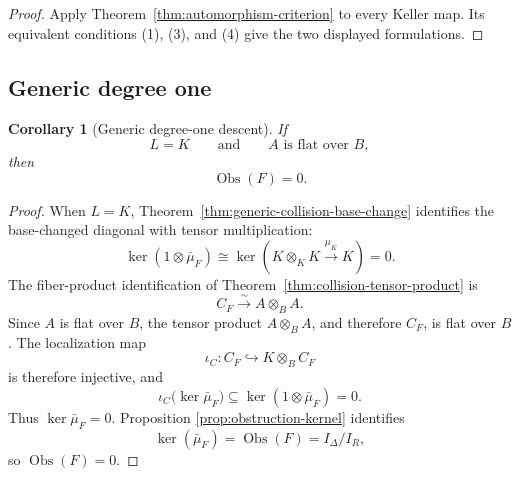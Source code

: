 \documentclass[11pt]{article}
\newtheorem{corollary}[theorem]{Corollary}
\theoremstyle{remark}
\theoremstyle{definition}
\newcommand{\Obs}{\operatorname{Obs}}
\begin{document}
\begin{proof}
Apply Theorem~\ref{thm:automorphism-criterion} to every Keller map.
Its equivalent conditions \textup{(1)}, \textup{(3)}, and \textup{(4)}
give the two displayed formulations.
\end{proof}

\subsection{Generic degree one}

\begin{corollary}[Generic degree-one descent]
\label{cor:generic-degree-one-descent}
If
\[
  L=K
  \qquad\text{and}\qquad
  A\text{ is flat over }B,
\]
then
\[
  \Obs(F)=0.
\]
\end{corollary}

\begin{proof}
When \(L=K\), Theorem~\ref{thm:generic-collision-base-change}
identifies the base-changed diagonal with tensor multiplication:
\[
  \ker(1\otimes\bar\mu_F)
  \cong
  \ker\!\left(
    K\otimes_KK\xrightarrow{\mu_K}K
  \right)
  =
  0.
\]
The fiber-product identification of
Theorem~\ref{thm:collision-tensor-product} is
\[
  C_F\xrightarrow{\sim}A\otimes_BA.
\]
Since \(A\) is flat over \(B\), the tensor product \(A\otimes_BA\), and
therefore \(C_F\), is flat over \(B\).  The localization map
\[
  \iota_C\colon C_F\hookrightarrow K\otimes_BC_F
\]
is therefore injective, and
\[
  \iota_C\bigl(\ker\bar\mu_F\bigr)
  \subseteq
  \ker(1\otimes\bar\mu_F)
  =
  0.
\]
Thus \(\ker\bar\mu_F=0\).  Proposition
\ref{prop:obstruction-kernel} identifies
\[
  \ker(\bar\mu_F)=\Obs(F)=I_\Delta/I_R,
\]
so \(\Obs(F)=0\).
\end{proof}
\end{document}
